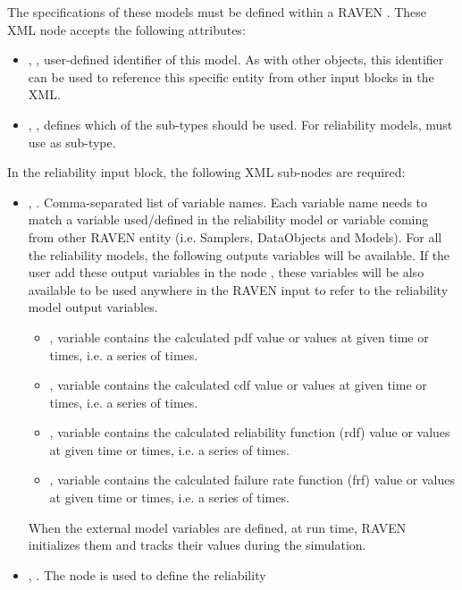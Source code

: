 The specifications of these models must be defined within a RAVEN . These
XML node accepts the following attributes:
\begin{itemize}
	\item {}, , user-defined identifier of this model.
	\nb As with other objects, this identifier can be used to reference this specific entity from other
	input blocks in the XML.
	\item {}, , defines which of the sub-types should
	be used. For reliability models, must use  as sub-type.
\end{itemize}
In the reliability  input block, the following XML sub-nodes are required:
\begin{itemize}
	\item {}, . Comma-separated list of variable
	names. Each variable name needs to match a variable used/defined in the reliability model or variable
	coming from other RAVEN entity (i.e. Samplers, DataObjects and Models).
	\nb For all the reliability models, the following outputs variables will be available. If the user
	add these output variables in the node , these variables will be also available to
	be used anywhere in the RAVEN input to refer to the reliability model output variables.
	\begin{itemize}
		\item {}, variable contains the calculated pdf value or values at given time or times,
		i.e. a series of times.
		\item {}, variable contains the calculated cdf value or values at given time or times,
		i.e. a series of times.
		\item {}, variable contains the calculated reliability function (rdf) value or values at
		given time or times, i.e. a series of times.
		\item {}, variable contains the calculated failure rate function (frf) value or values
		at given time or times, i.e. a series of times.
	\end{itemize}
	\nb When the external model variables are defined, at run time, RAVEN initializes
	them and tracks their values during the simulation.
	\item {}, . The node is used to define the reliability

\end{itemize}
